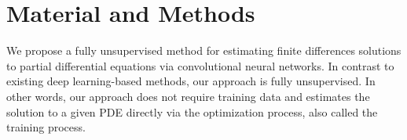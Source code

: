 \documentclass[preprint,12pt]{elsarticle}
\newcommand{\Bk}{\color{black}}
\newcommand{\Rd}{\color{red}}
\begin{document}




\section{Material and Methods} \label{sec:methods}
We propose a fully unsupervised method for estimating finite differences solutions to partial differential equations via convolutional neural networks. In contrast to existing deep learning-based methods, our approach is fully unsupervised. In other words, our approach does not require training data and estimates the solution to a given PDE directly via the optimization process, also called the training process. 
\end{document}
